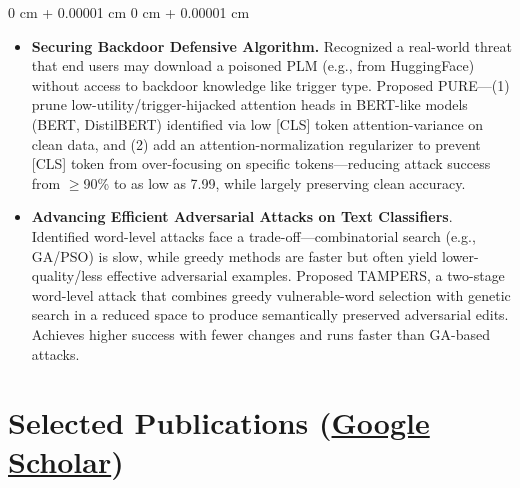 \documentclass[10pt, letterpaper]{article}
\newenvironment{highlights}{
    \begin{itemize}[
        topsep=0.10 cm,
        parsep=0.10 cm,
        partopsep=0pt,
        itemsep=0pt,
        leftmargin=0 cm + 10pt
    ]
}{
    \end{itemize}
} %
\newenvironment{onecolentry}{
    \begin{adjustwidth}{
        0 cm + 0.00001 cm
    }{
        0 cm + 0.00001 cm
    }
}{
    \end{adjustwidth}
} %
\begin{document}
\begin{onecolentry}
\begin{highlights}
                \item \textbf{Securing Backdoor Defensive Algorithm.} Recognized a real-world threat that end users may download a poisoned PLM (e.g., from HuggingFace) without access to backdoor knowledge like trigger type. Proposed PURE—(1) prune low-utility/trigger-hijacked attention heads in BERT-like models (BERT, DistilBERT) identified via low [CLS] token attention-variance on clean data, and (2) add an attention-normalization regularizer to prevent [CLS] token from over-focusing on specific tokens—reducing attack success from $\geq$90\% to as low as 7.99, while largely preserving clean accuracy.

                \item \textbf{Advancing Efficient Adversarial Attacks on Text Classifiers}. Identified word-level attacks face a trade-off—combinatorial search (e.g., GA/PSO) is slow, while greedy methods are faster but often yield lower-quality/less effective adversarial examples. Proposed TAMPERS, a two-stage word-level attack that combines greedy vulnerable-word selection with genetic search in a reduced space to produce semantically preserved adversarial edits. Achieves higher success with fewer changes and runs faster than GA-based attacks.        
            \end{highlights}
        \end{onecolentry}


    \section{Selected Publications (\href{https://scholar.google.com/citations?user=yVq7_1sAAAAJ&hl=en}{Google Scholar})}
\end{document}
